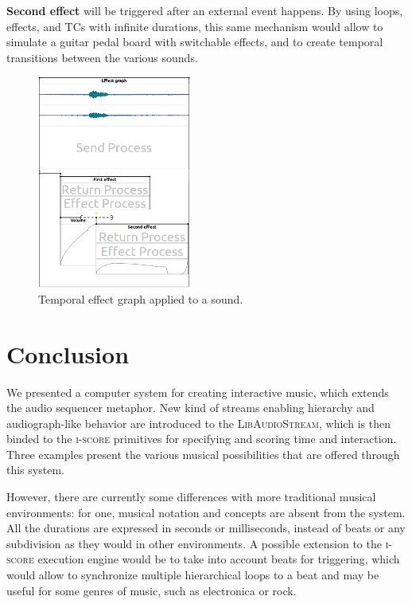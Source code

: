 \documentclass{article}
\newcommand*{\LibAudioStream}{\textsc{LibAudioStream}\xspace}
\newcommand*{\iscore}{\textsc{i-score}\xspace}
\newcommand*{\timeconstraints}{\acp{TC}\xspace}
\begin{document}
\textbf{Second effect} will be triggered after an external event happens.
By using loops, effects, and \timeconstraints with infinite durations, this same mechanism would allow to simulate a guitar pedal board with switchable effects, and to create temporal transitions between the various sounds.

\begin{figure}[h]
    \centering
    \includegraphics[width=0.45\textwidth]{figures/ex3.png}
    \caption{Temporal effect graph applied to a sound.}
    \label{fig.score3}
\end{figure}
\newpage
\section{Conclusion}
We presented a computer system for creating interactive music, which extends the audio sequencer metaphor.
New kind of streams enabling hierarchy and audiograph-like behavior are introduced to the \LibAudioStream, which is then binded to the \iscore primitives for specifying and scoring time and interaction.
Three examples present the various musical possibilities that are offered
through this system.

However, there are currently some differences with more traditional musical environments: for one, musical notation and concepts are absent from the system.
All the durations are expressed in seconds or milliseconds, instead of beats or any subdivision as they would in other environments. 
A possible extension to the \iscore execution engine would be to take into account beats for triggering, which would allow to synchronize multiple hierarchical loops to a beat and may be useful for some genres of music, such as electronica or rock.
\end{document}
